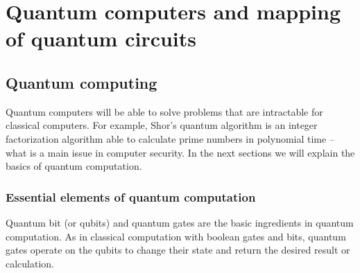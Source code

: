 
\chapter*{Quantum computers and mapping of quantum circuits}
\label{sec:org3d6a995}

\section*{Quantum computing}
\label{sec:org6e4169c}

Quantum computers will be able to solve problems that are intractable for classical computers.
For example, Shor's quantum algorithm is an integer factorization algorithm able to calculate prime numbers in polynomial time -- what is a main issue in computer security.
In the next sections we will explain the basics of quantum computation.

\subsection*{Essential elements of quantum computation}
\label{sec:orgb089b33}

Quantum bit (or qubits) and quantum gates are the basic ingredients in quantum computation.
As in classical computation with boolean gates and bits, quantum gates operate on the qubits to change their state and return the desired result or calculation.


